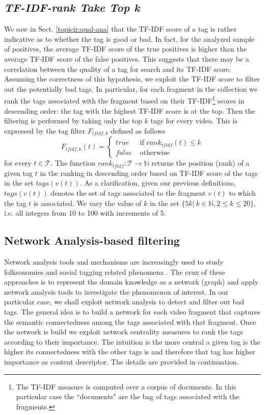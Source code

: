 \subsection{\textit{TF-IDF-rank Take Top k}}
We saw in Sect. \ref{topicir:qual-ana} that the TF-IDF score of a tag is rather indicative as to whether the tag is good or bad. In fact, for the analyzed sample of positives, the average TF-IDF score of the true positives is higher than the average TF-IDF score of the false positives. This suggests that there may be a correlation between the quality of a tag for search and its TF-IDF score. Assuming the correctness of this hypothesis, we exploit the TF-IDF score to filter out the potentially bad tags.  
In particular, for each fragment in the collection we rank the tags associated with the fragment based on their TF-IDF\footnote{The TF-IDF measure is computed over a corpus of documents. In this particular case the ``documents" are the bag of tags associated with the fragments.} scores in descending order: the tag with the highest TF-IDF score is at the top. Then the filtering is performed by taking only the top $k$ tags for every video. This is expressed by the tag filter $F_{tfidf,k}$ defined as follows
\begin{equation}
F_{tfidf,k}(t) = \left\{ 
	\begin{array}{rl}
	true &\mbox{ if $rank_{tfidf}(t) \leq k$} \\
	false &\mbox{ otherwise}
	\end{array}
\right.
\end{equation}
for every $t \in \mathcal{T}$. The function $rank_{tfidf}: \mathcal{T} \rightarrow \mathbb{N}$ returns the  position (rank) of a given tag $t$ in the ranking in descending order based on TF-IDF score of the tags in the set $tags(v(t))$. As a clarification, given our previous definitions, $tags(v(t))$ denotes the set of tags associated to the fragment $v(t)$ to which the tag $t$ is associated. We vary the value of $k$ in the set $\{5k|~k\in \mathbb{N}, 2 \leq k \leq 20\}$, i.e. all integers from 10 to 100 with increments of 5.

\subsection{Network Analysis-based filtering}
Network analysis tools and mechanisms \cite{netan1,netan2} are increasingly used to study folksonomies and social tagging related phenomena \cite{jilung2011network,conf/csse/Wu08b,journals/corr/abs-cs-0509072,Mika:2007:OUU:1229184.1229195,ilprints775,conf/iics/BothorelB11}. The crux of these approaches is to  represent the domain knowledge as a network (graph) and apply network analysis tools to investigate the phenomenon of interest. In our particular case, we shall exploit network analysis to detect and filter out bad tags. The general idea is to build a network for each video fragment that captures the semantic connectedness among the tags associated with that fragment. Once the network is build we exploit network centrality measures to rank the tags according to their importance. The intuition is the more central a given tag is the higher its connectedness with the other tags is and therefore that tag has higher importance as content descriptor. The details are provided in continuation.
